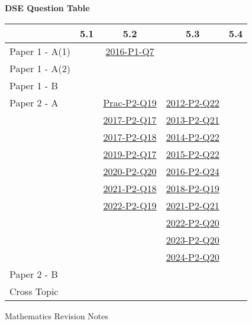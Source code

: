 \documentclass[12pt, a4paper]{article}
\begin{document}
\begin{absolutelynopagebreak}
\begin{center}
\textbf{DSE Question Table}
\end{center}
\begin{center}
\begin{tabular}{|l|c|c|c|c|}
\hline
        & 5.1 & 5.2 & 5.3 & 5.4 \\\hline
\hline
Paper 1 - A(1)&  & \hyperref[DSE2016-CoreP1-Q07]{2016-P1-Q7} &  &  \\
\hline
Paper 1 - A(2)&  &  &  &  \\
\hline
Paper 1 - B&  &  &  &  \\
\hline
\hline
Paper 2 - A&  & \hyperref[DSE2012P-CoreP2-Q19]{Prac-P2-Q19} & \hyperref[DSE2012-CoreP2-Q22]{2012-P2-Q22} &  \\
&  & \hyperref[DSE2017-CoreP2-Q17]{2017-P2-Q17} & \hyperref[DSE2013-CoreP2-Q21]{2013-P2-Q21} &  \\
&  & \hyperref[DSE2017-CoreP2-Q18]{2017-P2-Q18} & \hyperref[DSE2014-CoreP2-Q22]{2014-P2-Q22} &  \\
&  & \hyperref[DSE2019-CoreP2-Q17]{2019-P2-Q17} & \hyperref[DSE2015-CoreP2-Q22]{2015-P2-Q22} &  \\
&  & \hyperref[DSE2020-CoreP2-Q20]{2020-P2-Q20} & \hyperref[DSE2016-CoreP2-Q24]{2016-P2-Q24} &  \\
&  & \hyperref[DSE2021-CoreP2-Q18]{2021-P2-Q18} & \hyperref[DSE2018-CoreP2-Q19]{2018-P2-Q19} &  \\
&  & \hyperref[DSE2022-CoreP2-Q19]{2022-P2-Q19} & \hyperref[DSE2021-CoreP2-Q21]{2021-P2-Q21} &  \\
&  &  & \hyperref[DSE2022-CoreP2-Q20]{2022-P2-Q20} &  \\
&  &  & \hyperref[DSE2023-CoreP2-Q20]{2023-P2-Q20} &  \\
&  &  & \hyperref[DSE2024-CoreP2-Q20]{2024-P2-Q20} &  \\
\hline
Paper 2 - B&  &  &  &  \\
\hline
\hline
Cross Topic&  &  &  &  \\
\hline
\end{tabular}
\end{center}
\end{absolutelynopagebreak}
\newpage
\newpage
\thispagestyle{empty}
\begin{center}
Mathematics Revision Notes\\\vspace{1cm}
\\\vspace{1cm}
{\fontsize{24pt}{24pt}\selectfont {More about Statistical Diagrams}} \\\vspace{1cm}
\label{chapter:S2-6}

\end{center}
\vspace{0.5cm}
\hline
\end{document}

